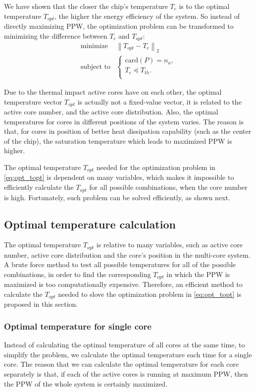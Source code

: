 We have shown that the closer the chip's temperature $T_{c}$ is to the optimal temperature $T_{opt}$, the higher the energy efficiency of the system. So instead of directly maximizing PPW, the optimization problem can be transformed to minimizing the difference between $T_{c}$ and $T_{opt}$:
\begin{equation}\label{eq:opt_topt}
\begin{split}
\text{minimize } &  \left \| T_{opt} - T_{c} \right \|_{2}\\
\text{subject to} &\left\{
\begin{array}{lr}
\text{card}(P) = n_{a},\\
T_{c} \preceq T_{th}.\\
\end{array}
\right.
\end{split}
\end{equation}

Due to the thermal impact active cores have on each other, the optimal temperature vector $T_{opt}$ is actually not a fixed-value vector, it is related to the active core number, and the active core distribution. Also, the optimal temperatures for cores in different positions of the system varies. The reason is that, for cores in position of better heat dissipation capability (such as the center of the chip), the saturation temperature which leads to maximized PPW is higher.

The optimal temperature $T_{opt}$ needed for the optimization problem in \eqref{eq:opt_topt} is dependent on many variables, which makes it impossible to efficiently calculate the $T_{opt}$ for all possible combinations, when the core number is high. Fortunately, such problem can be solved efficiently, as shown next.

\subsection{Optimal temperature calculation}
The optimal temperature $T_{opt}$ is relative to many variables, such as active core number, active core distribution and the core's position in the multi-core system. A brute force method to test all possible temperatures for all of the possible combinations, in order to find the corresponding $T_{opt}$ in which the PPW is maximized is too computationally expensive. Therefore, an efficient method to calculate the $T_{opt}$ needed to slove the optimization problem in \eqref{eq:opt_topt} is proposed in this section.

\subsubsection{Optimal temperature for single core}
Instead of calculating the optimal temperature of all cores at the same time, to simplify the problem, we calculate the optimal temperature each time for a single core.
The reason that we can calculate the optimal temperature for each core separately is that, if each of the active cores is running at maximum PPW, then the PPW of the whole system is certainly maximized.

